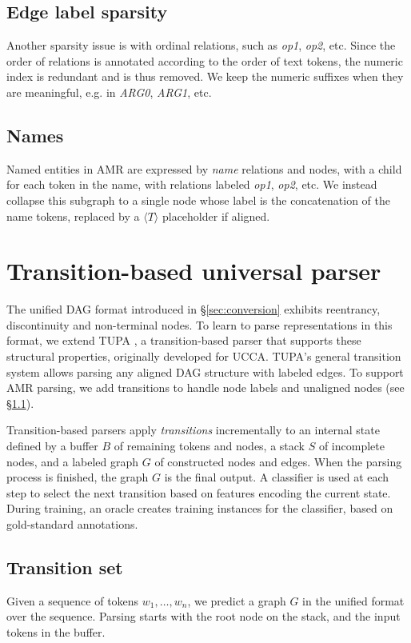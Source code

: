 \documentclass[11pt,a4paper]{article}
\begin{document}
\subsection{Edge label sparsity}
Another sparsity issue is with ordinal relations, such as \textit{op1}, \textit{op2}, etc.
Since the order of relations is annotated according to the order of text tokens,
the numeric index is redundant and is thus removed.
We keep the numeric suffixes when they are meaningful, e.g. in \textit{ARG0}, \textit{ARG1}, etc.

\subsection{Names}
Named entities in AMR are expressed by \textit{name} relations and nodes, with
a child for each token in the name, with relations labeled \textit{op1}, \textit{op2}, etc.
We instead collapse this subgraph to a single node whose label is the concatenation of the
name tokens, replaced by a $\langle T \rangle$ placeholder if aligned.



\section{Transition-based universal parser}\label{sec:model}

The unified DAG format introduced in \S\ref{sec:conversion}
exhibits reentrancy, discontinuity and non-terminal nodes.
To learn to parse representations in this format,
we extend TUPA \cite{hershcovich2017a},
a transition-based parser that supports these structural properties,
originally developed for UCCA.
TUPA's general transition system allows parsing any aligned DAG structure with labeled edges.
To support AMR parsing, we add transitions to handle node labels and unaligned nodes
(see \S\ref{sec:transition_set}).

Transition-based parsers \cite{Nivre03anefficient} apply \textit{transitions}
incrementally to an internal state defined by
a buffer $B$ of remaining tokens and nodes,
a stack $S$ of incomplete nodes,
and a labeled graph $G$ of constructed nodes and edges.
When the parsing process is finished, the graph $G$ is the final output.
A classifier is used at each step to select the next transition based on features
encoding the current state.
During training, an oracle creates training instances for the classifier,
based on gold-standard annotations.


\subsection{Transition set}\label{sec:transition_set}
Given a sequence of tokens $w_1, \ldots, w_n$,
we predict a graph $G$ in the unified format over the sequence.
Parsing starts with the root node on the stack,
and the input tokens in the buffer.
\end{document}
